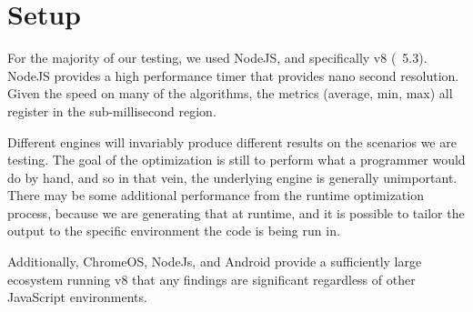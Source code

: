 \section{Setup}

For the majority of our testing, we used NodeJS, and specifically v8 (~5.3).  NodeJS provides a high performance timer that provides nano second resolution.  Given the speed on many of the algorithms, the metrics (average, min, max) all register in the sub-millisecond region.  

Different engines will invariably produce different results on the scenarios we are testing.  The goal of the optimization is still to perform what a programmer would do by hand, and so in that vein, the underlying engine is generally unimportant.  There may be some additional performance from the runtime optimization process, because we are generating that at runtime, and it is possible to tailor the output to the specific environment the code is being run in.

Additionally, ChromeOS, NodeJs, and Android provide a sufficiently large ecosystem running v8 that any findings are significant regardless of other JavaScript environments.

